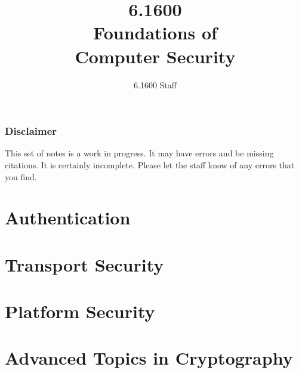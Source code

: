 \documentclass[
letterpaper, %
oneside,
nobib
]{tufte-book}
\author{6.1600 Staff}
\title{6.1600\\Foundations of\\Computer Security}
\begin{document}
\mainmatter

\maketitle

\section{Disclaimer}
This set of notes is a work in progress. It may have errors and be missing citations. It is certainly incomplete. Please let the staff know of any errors that you find.

\clearpage

\tableofcontents*
\clearpage





\part{Authentication}







\part{Transport Security}





 


\part{Platform Security} 






 
% 


\part{Advanced Topics in Cryptography}


\backmatter

\printbibliography
\end{document}
